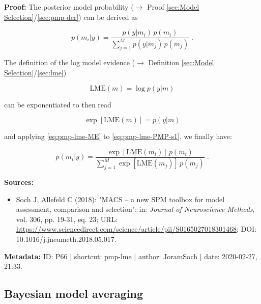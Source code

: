 \documentclass[a4paper,12pt,twoside]{book}
\begin{document}
\vspace{1em}
\textbf{Proof:} The posterior model probability ($\rightarrow$ Proof \ref{sec:Model Selection}/\ref{sec:pmp-der}) can be derived as

\begin{equation} \label{eq:pmp-lme-PMP-s1}
p(m_i|y) = \frac{p(y|m_i) \, p(m_i)}{\sum_{j=1}^{M} p(y|m_j) \, p(m_j)} \; .
\end{equation}

The definition of the log model evidence ($\rightarrow$ Definition \ref{sec:Model Selection}/\ref{sec:lme})

\begin{equation} \label{eq:pmp-lme-LME}
\mathrm{LME}(m) = \log p(y|m)
\end{equation}

can be exponentiated to then read

\begin{equation} \label{eq:pmp-lme-ME}
\exp\left[ \mathrm{LME}(m) \right] = p(y|m)
\end{equation}

and applying \eqref{eq:pmp-lme-ME} to \eqref{eq:pmp-lme-PMP-s1}, we finally have:

\begin{equation} \label{eq:pmp-lme-PMP-s2}
p(m_i|y) = \frac{\exp[\mathrm{LME}(m_i)] \, p(m_i)}{\sum_{j=1}^{M} \exp[\mathrm{LME}(m_j)] \, p(m_j)} \; .
\end{equation}


\vspace{1em}
\textbf{Sources:}
\begin{itemize}
\item Soch J, Allefeld C (2018): "MACS – a new SPM toolbox for model assessment, comparison and selection"; in: \textit{Journal of Neuroscience Methods}, vol. 306, pp. 19-31, eq. 23; URL: \url{https://www.sciencedirect.com/science/article/pii/S0165027018301468}; DOI: 10.1016/j.jneumeth.2018.05.017.
\end{itemize}


\vspace{1em}
\textbf{Metadata:} ID: P66 | shortcut: pmp-lme | author: JoramSoch | date: 2020-02-27, 21:33.
\vspace{1em}



\subsection{Bayesian model averaging}
\end{document}
